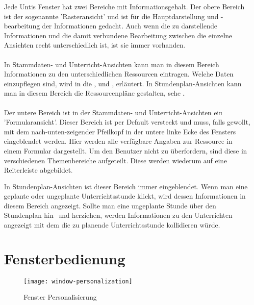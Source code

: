 Jede Untis Fenster hat zwei Bereiche mit Informationsgehalt. Der obere Bereich ist der sogenannte 'Rasteransicht' und ist für die Hauptdarstellung und -bearbeitung der Informationen gedacht. Auch wenn die zu darstellende Informationen und die damit verbundene Bearbeitung zwischen die einzelne Ansichten recht unterschiedlich ist, ist sie immer vorhanden.\\
\\
In Stammdaten- und Unterricht-Ansichten kann man in diesem Bereich Informationen zu den unterschiedlichen Ressourcen eintragen. Welche Daten einzupflegen sind, wird in die , und , erläutert. In Stundenplan-Ansichten kann man in diesem Bereich die Ressourcenpläne gestalten, sehe .\\
\\
Der untere Bereich ist in der Stammdaten- und Unterricht-Ansichten ein 'Formularansicht'. Dieser Bereich ist per Default versteckt und muss, falls gewollt, mit dem nach-unten-zeigender Pfeilkopf in der untere linke Ecke des Fensters eingeblendet werden. Hier werden alle verfügbare Angaben zur Ressource in einem Formular dargestellt. Um den Benutzer nicht zu überfordern, sind diese in verschiedenen Themenbereiche aufgeteilt. Diese werden wiederum auf eine Reiterleiste abgebildet.\\

\newpage

\noindent
In Stundenplan-Ansichten ist dieser Bereich immer eingeblendet. Wenn man eine geplante oder ungeplante Unterrichtsstunde klickt, wird dessen Informationen in diesem Bereich angezeigt. Sollte man eine ungeplante Stunde über den Stundenplan hin- und herziehen, werden Informationen zu den Unterrichten angezeigt mit dem die zu planende Unterrichtsstunde kollidieren würde.\\

\section{Fensterbedienung}

\begin{wrapfigure}{r}{0.4\textwidth}
	\vspace{-14pt}
	\texttt{[image: window-personalization]}
	\vspace{-5pt}
	\caption{Fenster Personalisierung}
	\label{fig:window-personalization}
\end{wrapfigure}

